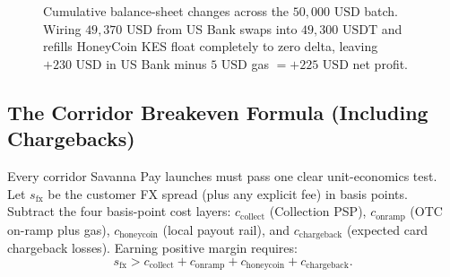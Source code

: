 \begin{figure}[htbp]
\caption{Cumulative balance-sheet changes across the $50{,}000\text{ USD}$ batch. Wiring $49{,}370\text{ USD}$ from US Bank swaps into $49{,}300\text{ USDT}$ and refills HoneyCoin KES float completely to zero delta, leaving $+230\text{ USD}$ in US Bank minus $5\text{ USD}$ gas $= +225\text{ USD}$ net profit.}
\label{fig:stage-balance-timeline}
\end{figure}

\subsection{The Corridor Breakeven Formula (Including Chargebacks)}

Every corridor Savanna Pay launches must pass one clear unit-economics test. Let $s_{\text{fx}}$ be the customer FX spread (plus any explicit fee) in basis points. Subtract the four basis-point cost layers: $c_{\text{collect}}$ (Collection PSP), $c_{\text{onramp}}$ (OTC on-ramp plus gas), $c_{\text{honeycoin}}$ (local payout rail), and $c_{\text{chargeback}}$ (expected card chargeback losses). Earning positive margin requires:
\[
  s_{\text{fx}} > c_{\text{collect}} + c_{\text{onramp}} + c_{\text{honeycoin}} + c_{\text{chargeback}}.
\]

